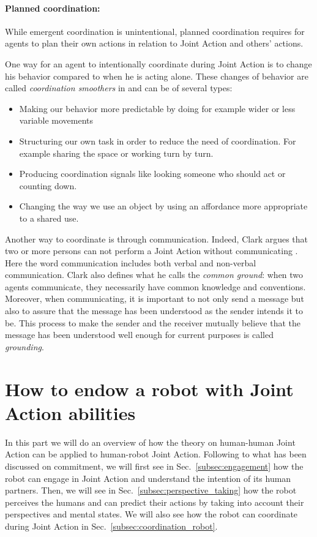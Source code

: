 \documentclass[english,a4paper,11pt,twoside]{StyleThese}
\begin{document}
\paragraph{Planned coordination:} 
While emergent coordination is unintentional, planned coordination requires for agents to plan their own actions in relation to Joint Action and others' actions.

One way for an agent to intentionally coordinate during Joint Action is to change his behavior compared to when he is acting alone. These changes of behavior are called \textit{coordination smoothers} in \cite{vesper2010minimal} and can be of several types:
\begin{itemize}
\item Making our behavior more predictable by doing for example wider or less variable movements
\item Structuring our own task in order to reduce the need of coordination. For example sharing the space or working turn by turn.
\item Producing coordination signals like looking someone who should act or counting down.
\item Changing the way we use an object by using an affordance more appropriate to a shared use.
\end{itemize}

Another way to coordinate is through communication. Indeed, Clark argues that two or more persons can not perform a Joint Action without communicating \cite{clark1996using}. Here the word communication includes both verbal and non-verbal communication. Clark also defines what he calls the \textit{common ground}: when two agents communicate, they necessarily have common knowledge and conventions. Moreover, when communicating, it is important to not only send a message but also to assure that the message has been understood as the sender intends it to be. This process to make the sender and the receiver mutually believe that the message has been understood well enough for current purposes is called \textit{grounding}.


\section{How to endow a robot with Joint Action abilities}

In this part we will do an overview of how the theory on human-human Joint Action can be applied to human-robot Joint Action. Following to what has been discussed on commitment, we will first see in Sec.~\ref{subsec:engagement} how the robot can engage in Joint Action and understand the intention of its human partners. Then, we will see in Sec.~\ref{subsec:perspective_taking} how the robot perceives the humans and can predict their actions by taking into account their perspectives and mental states. We will also see how the robot can coordinate during Joint Action in Sec.~\ref{subsec:coordination_robot}.
\end{document}
